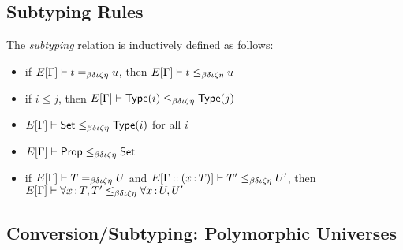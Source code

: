 \documentclass{article}
\begin{document}
\subsection{Subtyping Rules}
The \emph{subtyping} relation is inductively defined as follows:
\begin{itemize}
\item if $E[\Gamma] \vdash t =_{\beta\delta\iota\zeta\eta} u$, then $E[\Gamma] \vdash t \leq_{\beta\delta\iota\zeta\eta} u$
\item if $i \leq j$, then $E[\Gamma] \vdash \mathsf{Type}(i) \leq_{\beta\delta\iota\zeta\eta} \mathsf{Type}(j)$
\item $E[\Gamma] \vdash \mathsf{Set} \leq_{\beta\delta\iota\zeta\eta} \mathsf{Type}(i)$ for all $i$
\item $E[\Gamma] \vdash \mathsf{Prop} \leq_{\beta\delta\iota\zeta\eta} \mathsf{Set}$
\item if $E[\Gamma] \vdash T =_{\beta\delta\iota\zeta\eta} U$ and
  $E[\Gamma \mathbin{::} (x {\,:\,} T)] \vdash T' \leq_{\beta\delta\iota\zeta\eta} U'$, then
  $E[\Gamma] \vdash \forall x {\,:\,} T , T' \leq_{\beta\delta\iota\zeta\eta} \forall x {\,:\,} U , U'$
\end{itemize}

\subsection{Conversion/Subtyping: Polymorphic Universes}
\end{document}
